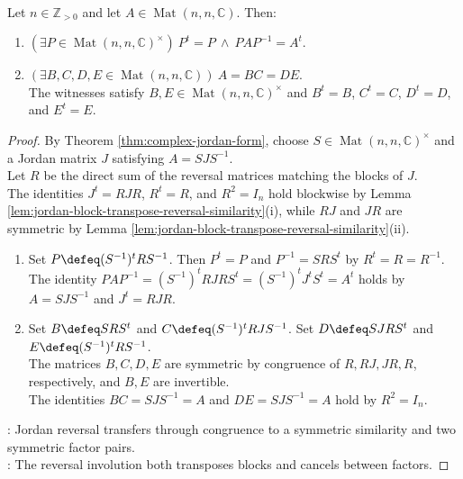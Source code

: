 \begin{theorem} \label{thm:matrix-similar-to-transpose-and-symmetric-factorizations} \\
Let $n\in\mathbb{Z}_{>0}$ and let $A\in\operatorname{Mat}(n,n,\mathbb{C})$. Then:
\begin{enumerate}[label=(\roman*)]
\setlength{\itemsep}{0pt}
\item $(\exists P\in\operatorname{Mat}(n,n,\mathbb{C})^\times)\ P^t=P\ \land\ PAP^{-1}=A^t$.
\item $(\exists B,C,D,E\in\operatorname{Mat}(n,n,\mathbb{C}))\ A=BC=DE$.\\
The witnesses satisfy $B,E\in\operatorname{Mat}(n,n,\mathbb{C})^\times$ and $B^t=B$, $C^t=C$, $D^t=D$, and $E^t=E$.
\end{enumerate}
\begin{proof}
By Theorem \ref{thm:complex-jordan-form}, choose $S\in\operatorname{Mat}(n,n,\mathbb{C})^\times$ and a Jordan matrix $J$ satisfying $A=SJS^{-1}$.\\
Let $R$ be the direct sum of the reversal matrices matching the blocks of $J$.\\
The identities $J^t=RJR$, $R^t=R$, and $R^2=I_n$ hold blockwise by Lemma \ref{lem:jordan-block-transpose-reversal-similarity}(i), while $RJ$ and $JR$ are symmetric by Lemma \ref{lem:jordan-block-transpose-reversal-similarity}(ii).
\begin{enumerate}[label=(\roman*)]
\setlength{\itemsep}{0pt}
\item Set $P\defeq(S^{-1})^tRS^{-1}$. Then $P^t=P$ and $P^{-1}=SRS^t$ by $R^t=R=R^{-1}$.\\
The identity $PAP^{-1}=(S^{-1})^tRJRS^t=(S^{-1})^tJ^tS^t=A^t$ holds by $A=SJS^{-1}$ and $J^t=RJR$.
\item Set $B\defeq SRS^t$ and $C\defeq(S^{-1})^tRJS^{-1}$. Set $D\defeq SJRS^t$ and $E\defeq(S^{-1})^tRS^{-1}$.\\
The matrices $B,C,D,E$ are symmetric by congruence of $R,RJ,JR,R$, respectively, and $B,E$ are invertible.\\
The identities $BC=SJS^{-1}=A$ and $DE=SJS^{-1}=A$ hold by $R^2=I_n$.
\end{enumerate}
: Jordan reversal transfers through congruence to a symmetric similarity and two symmetric factor pairs.\\
: The reversal involution both transposes blocks and cancels between factors.
\end{proof}
\end{theorem}

